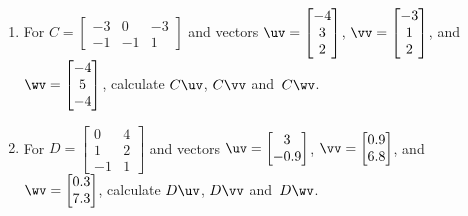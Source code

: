 \begin{exercise}
\begin{enumerate}
\item For \(C=\begin{bmatrix} -3&0&-3
\\-1&-1&1 \end{bmatrix}\) and vectors 
\(\uv=\begin{bmatrix} -4\\3\\2 \end{bmatrix}\), 
\(\vv=\begin{bmatrix} -3\\1\\2 \end{bmatrix}\), and
\(\wv=\begin{bmatrix} -4\\5\\-4 \end{bmatrix}\), 
calculate  \(C\uv\), \(C\vv\) and~\(C\wv\).


\item For \(D=\begin{bmatrix} 0&4
\\1&2
\\-1&1 \end{bmatrix}\) and vectors 
\(\uv=\begin{bmatrix} 3\\-0.9 \end{bmatrix}\), 
\(\vv=\begin{bmatrix} 0.9\\6.8 \end{bmatrix}\), and
\(\wv=\begin{bmatrix} 0.3\\7.3 \end{bmatrix}\), 
calculate  \(D\uv\), \(D\vv\) and~\(D\wv\).

\end{enumerate}
\end{exercise}




